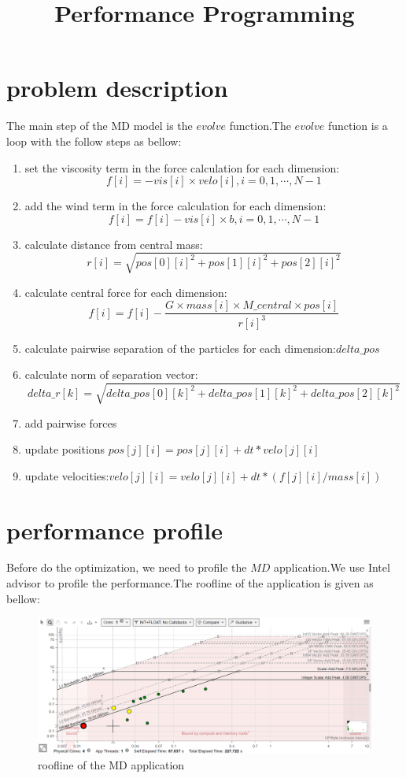 \documentclass{article}
\title{Performance Programming}
\date{}
\begin{document}
\section{problem description}

The main step of the MD model is the $evolve$ function.The $evolve$
function is a loop with the follow steps as bellow:
\begin{enumerate}
\item set the viscosity term in the force calculation for each dimension:
\begin{equation}\label{viscosity}
	f[i]=-vis[i]\times velo[i],i=0,1,\cdots,N-1
\end{equation}
\item add the wind term in the force calculation for each dimension:
\begin{equation}\label{wind}
f[i]=f[i]-vis[i]\times b,i=0,1,\cdots,N-1
\end{equation}
\item calculate distance from central mass:
\begin{equation}\label{distance}
	r[i]=\sqrt{pos[0][i]^{2}+pos[1][i]^{2}+pos[2][i]^{2}}
\end{equation}
\item calculate central force for each dimension:
\begin{equation}\label{centralforce}
	f[i]=f[i]-\frac{G\times mass[i]\times M\_central\times pos[i]}{r[i]^{3}}
\end{equation}
\item calculate pairwise separation of the particles for each dimension:$delta\_pos$
\item calculate norm of separation vector: %
$$delta\_r[k]=\sqrt{delta\_pos[0][k]^{2}+delta\_pos[1][k]^{2}+delta\_pos[2][k]^{2}}$$
\item add pairwise forces
\item update positions $pos[j][i]=pos[j][i]+dt*velo[j][i]$
\item update velocities:$velo[j][i]=velo[j][i]+dt*(f[j][i]/mass[i])$
\end{enumerate}

\section{performance profile}

Before do the optimization, we need to profile the $MD$ application.We
use Intel advisor to profile the performance.The roofline of the application
is given as bellow:
\begin{figure}[H]
	\centering
	\includegraphics[width=0.7\linewidth]{roofline}
	\caption{roofline of the MD application}
	\label{fig:roofline}
\end{figure}
\end{document}
